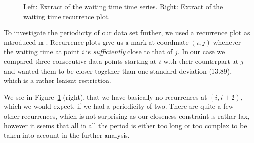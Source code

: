 \documentclass[english,final]{scrartcl}
\begin{document}
\begin{figure}[htbp]
\caption{Left: Extract of the waiting time time series. Right: Extract of the waiting time recurrence plot.}
\label{fig:ts}
\end{figure}

To investigate the periodicity of our data set further, we used a recurrence plot as introduced in \cite{recurrence}. Recurrence plots give us a mark at coordinate $(i,j)$ whenever the waiting time at point $i$ is \emph{sufficiently} close to that of $j$. In our case we compared three consecutive data points starting at $i$ with their counterpart at $j$ and wanted them to be closer together than one standard deviation (13.89), which is a rather lenient restriction.

We see in Figure~\ref{fig:ts} (right), that we have basically no recurrences at $(i,i+2)$, which we would expect, if we had a periodicity of two. There are quite a few other recurrences, which is not surprising as our closeness constraint is rather lax, however it seems that all in all the period is either too long or too complex to be taken into account in the further analysis.
\end{document}
